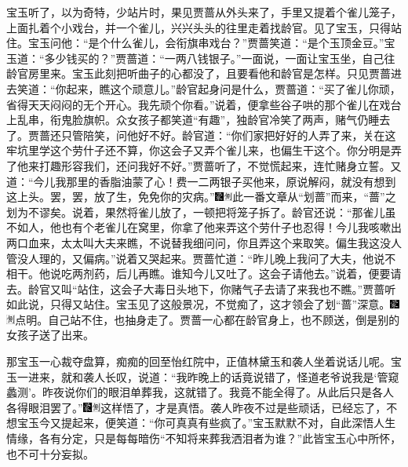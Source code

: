 宝玉听了，以为奇特，少站片时，果见贾蔷从外头来了，手里又提着个雀儿笼子，上面扎着个小戏台，并一个雀儿，兴兴头头的往里走着找龄官。见了宝玉，只得站住。宝玉问他：“是个什么雀儿，会衔旗串戏台？”贾蔷笑道：“是个玉顶金豆。”宝玉道：“多少钱买的？”贾蔷道：“一两八钱银子。”一面说，一面让宝玉坐，自己往龄官房里来。宝玉此刻把听曲子的心都没了，且要看他和龄官是怎样。只见贾蔷进去笑道：“你起来，瞧这个顽意儿。”龄官起身问是什么，贾蔷道：“买了雀儿你顽，省得天天闷闷的无个开心。我先顽个你看。”说着，便拿些谷子哄的那个雀儿在戏台上乱串，衔鬼脸旗帜。众女孩子都笑道“有趣”，独龄官冷笑了两声，赌气仍睡去了。贾蔷还只管陪笑，问他好不好。龄官道：“你们家把好好的人弄了来，关在这牢坑里学这个劳什子还不算，你这会子又弄个雀儿来，也偏生干这个。你分明是弄了他来打趣形容我们，还问我好不好。”贾蔷听了，不觉慌起来，连忙赌身立誓。又道：“今儿我那里的香脂油蒙了心！费一二两银子买他来，原说解闷，就没有想到这上头。罢，罢，放了生，免免你的灾病。”{\includegraphics[width=3mm]{../Images/00006}\includegraphics[width=3mm]{../Images/00011}\footnotesize \kaishu 此一番文章从“划蔷”而来，“蔷”之划为不谬矣。}说着，果然将雀儿放了，一顿把将笼子拆了。龄官还说：“那雀儿虽不如人，他也有个老雀儿在窝里，你拿了他来弄这个劳什子也忍得！今儿我咳嗽出两口血来，太太叫大夫来瞧，不说替我细问问，你且弄这个来取笑。偏生我这没人管没人理的，又偏病。”说着又哭起来。贾蔷忙道：“昨儿晚上我问了大夫，他说不相干。他说吃两剂药，后儿再瞧。谁知今儿又吐了。这会子请他去。”说着，便要请去。龄官又叫“站住，这会子大毒日头地下，你赌气子去请了来我也不瞧。”贾蔷听如此说，只得又站住。宝玉见了这般景况，不觉痴了，这才领会了划“蔷”深意。{\includegraphics[width=3mm]{../Images/00006}\includegraphics[width=3mm]{../Images/00011}\footnotesize \kaishu 点明。}自己站不住，也抽身走了。贾蔷一心都在龄官身上，也不顾送，倒是别的女孩子送了出来。

那宝玉一心裁夺盘算，痴痴的回至怡红院中，正值林黛玉和袭人坐着说话儿呢。宝玉一进来，就和袭人长叹，说道：“我昨晚上的话竟说错了，怪道老爷说我是‘管窥蠡测’。昨夜说你们的眼泪单葬我，这就错了。我竟不能全得了。从此后只是各人各得眼泪罢了。”{\includegraphics[width=3mm]{../Images/00006}\includegraphics[width=3mm]{../Images/00011}\footnotesize \kaishu 这样悟了，才是真悟。}袭人昨夜不过是些顽话，已经忘了，不想宝玉今又提起来，便笑道：“你可真真有些疯了。”宝玉默默不对，自此深悟人生情缘，各有分定，只是每每暗伤“不知将来葬我洒泪者为谁？”此皆宝玉心中所怀，也不可十分妄拟。

